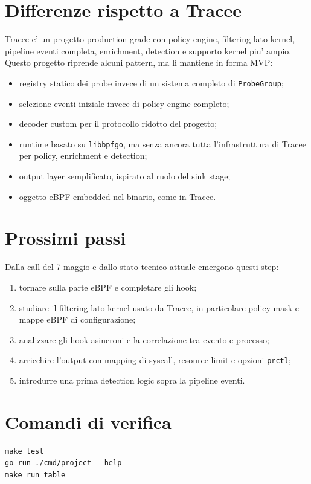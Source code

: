 \documentclass[11pt,a4paper]{article}
\begin{document}
\section{Differenze rispetto a Tracee}

Tracee e' un progetto production-grade con policy engine, filtering lato kernel,
pipeline eventi completa, enrichment, detection e supporto kernel piu' ampio.
Questo progetto riprende alcuni pattern, ma li mantiene in forma MVP:

\begin{itemize}
  \item registry statico dei probe invece di un sistema completo di
  \texttt{ProbeGroup};
  \item selezione eventi iniziale invece di policy engine completo;
  \item decoder custom per il protocollo ridotto del progetto;
  \item runtime basato su \texttt{libbpfgo}, ma senza ancora tutta
  l'infrastruttura di Tracee per policy, enrichment e detection;
  \item output layer semplificato, ispirato al ruolo del sink stage;
  \item oggetto eBPF embedded nel binario, come in Tracee.
\end{itemize}

\section{Prossimi passi}

Dalla call del 7 maggio e dallo stato tecnico attuale emergono questi step:

\begin{enumerate}
  \item tornare sulla parte eBPF e completare gli hook;
  \item studiare il filtering lato kernel usato da Tracee, in particolare policy
  mask e mappe eBPF di configurazione;
  \item analizzare gli hook asincroni e la correlazione tra evento e processo;
  \item arricchire l'output con mapping di syscall, resource limit e opzioni
  \texttt{prctl};
  \item introdurre una prima detection logic sopra la pipeline eventi.
\end{enumerate}

\section{Comandi di verifica}

\begin{lstlisting}[style=terminal]
make test
go run ./cmd/project --help
make run_table
\end{lstlisting}
\end{document}
